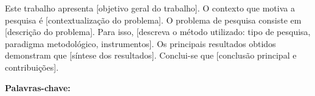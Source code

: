 
\begin{resumo}

Este trabalho apresenta [objetivo geral do trabalho]. O contexto
que motiva a pesquisa é [contextualização do problema]. O problema
de pesquisa consiste em [descrição do problema]. Para isso,
[descreva o método utilizado: tipo de pesquisa, paradigma
metodológico, instrumentos]. Os principais resultados obtidos
demonstram que [síntese dos resultados]. Conclui-se que
[conclusão principal e contribuições].

\vspace{\onelineskip}

\noindent
\textbf{Palavras-chave:} \palavraschave

\end{resumo}
